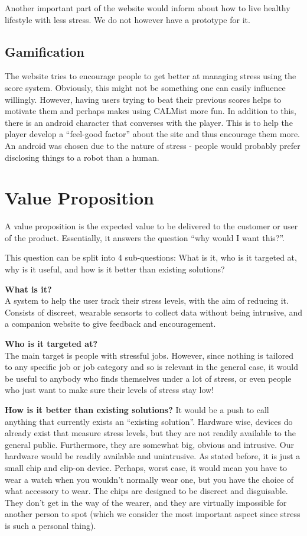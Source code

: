 \documentclass{scrartcl}
\begin{document}
Another important part of the website would inform about how to live healthy lifestyle with less stress. We do not however have a prototype for it.

\subsection{Gamification}

The website tries to encourage people to get better at managing stress using the score system. Obviously, this might not be something one can easily influence willingly. However, having users trying to beat their previous scores helps to motivate them and perhaps makes using CALMist more fun.
In addition to this, there is an android character that converses with the player. This is to help the
player develop a ``feel-good factor'' about the site and thus encourage them more. An android was chosen
due to the nature of stress - people would probably prefer disclosing things to a robot than a human.

\section{Value Proposition}
A value proposition is the expected value to be delivered to the customer or user of the product. Essentially, it answers the
question ``why would I want this?''.

This question can be split into 4 sub-questions: What is it, who is it targeted at, why is it useful, and how is it better than
existing solutions?

\textbf{What is it?}\\
A system to help the user track their stress levels, with the aim of reducing it. Consists of discreet, wearable sensorts to collect
data without being intrusive, and a companion website to give feedback and encouragement.

\textbf{Who is it targeted at?}\\
The main target is people with stressful jobs. However, since nothing is tailored to any specific job or job category and so
is relevant in the general case, it would be useful to anybody who finds themselves under a lot of stress, or even people
who just want to make sure their levels of stress stay low!

\textbf{How is it better than existing solutions?}
It would be a push to call anything that currently exists an ``existing solution''. Hardware wise, devices do already exist that
measure stress levels, but they are not readily available to the general public. Furthermore, they are somewhat big, obvious and
intrusive. Our hardware would be readily available and unintrusive. As stated before, it is just a small chip and clip-on device.
Perhaps, worst case, it would mean you have to wear a watch when you wouldn't normally wear one, but you have the choice of what
accessory to wear. The chips are designed to be discreet and disguisable. They don't get in the way of the wearer, and they are
virtually impossible for another person to spot (which we consider the most important aspect since stress is such a personal
thing).
\end{document}
